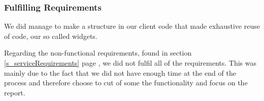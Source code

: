 \subsubsection{Fulfilling Requirements}
We did manage to make a structure in our client code that made exhaustive reuse of code, our so called widgets.

Regarding the non-functional requirements, found in section \ref{s_serviceRequirements} page \pageref{s_serviceRequirements}, we did not fulfil all of the requirements. This was mainly due to the fact that we did not have enough time at the end of the process and therefore choose to cut of some the functionality and focus on the report.